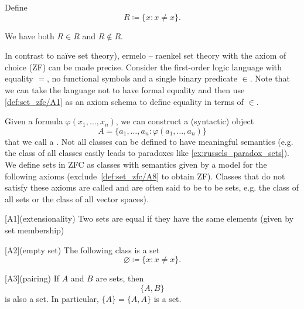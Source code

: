 \begin{example}\label{ex:russels_paradox_sets}
  Define
  \begin{equation*}
    R \coloneqq \{ x \colon x \neq x \}.
  \end{equation*}

  We have both \( R \in R \) and \( R \not\in R \).
\end{example}

\begin{definition}\label{def:set_zfc}\cite[271]{Enderton1977}
  In contrast to na\"ive set theory), ermelo – raenkel set theory with the axiom of choice (ZF) can be made precise. Consider the first-order logic language with equality \( = \), no functional symbols and a single binary predicate \( \in \). Note that we can take the language not to have formal equality and then use \cref{def:set_zfc/A1} as an axiom schema to define equality in terms of \( \in \).

  Given a formula \( \varphi(x_1, \ldots, x_n) \), we can construct a (syntactic) object
  \begin{equation*}
    A = \{ a_1, \ldots, a_n \colon \varphi(a_1, \ldots, a_n) \}
  \end{equation*}
  that we call a . Not all classes can be defined to have meaningful semantics (e.g. the class of all classes easily leads to paradoxes like \cref{ex:russels_paradox_sets}). We define sets in ZFC as classes with semantics given by a model for the following axioms (exclude~\ref{def:set_zfc/A8} to obtain ZF). Classes that do not satisfy these axioms are called  and are often said to be  to be sets, e.g. the class of all sets or the class of all vector spaces).

  \begin{description}
    [A1](extensionality) Two sets are equal if they have the same elements (given by set membership)

    [A2](empty set) The following class is a set
    \begin{equation*}
      \varnothing \coloneqq \{ x \colon x \neq x \}.
    \end{equation*}

    [A3](pairing) If \( A \) and \( B \) are sets, then
    \begin{equation*}
      \{ A, B \}
    \end{equation*}
    is also a set. In particular, \( \{ A \} = \{ A, A \} \) is a set.


\end{description}
\end{definition}
